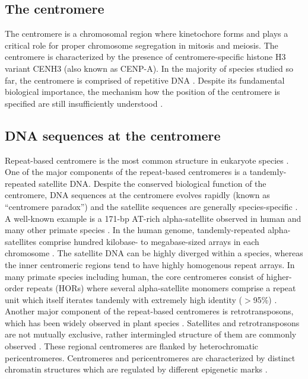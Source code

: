 \subsection*{The centromere}
  The centromere is a chromosomal region where kinetochore forms and plays a critical role for proper chromosome segregation in mitosis and meiosis. The centromere is characterized by the presence of centromere-specific histone H3 variant CENH3 (also known as CENP-A). In the majority of species studied so far, the centromere is comprised of repetitive DNA \cite{Plohl2014}. Despite its fundamental biological importance, the mechanism how the position of the centromere is specified are still insufficiently understood \cite{McKinley2016}.


\subsection*{DNA sequences at the centromere}
  Repeat-based centromere is the most common structure in eukaryote species \cite{Plohl2014}. One of the major components of the repeat-based centromeres is a tandemly-repeated satellite DNA. Despite the conserved biological function of the centromere, DNA sequences at the centromere evolves rapidly (known as ``centromere paradox'') and the satellite sequences are generally species-specific \cite{Henikoff2001}. A well-known example is a 171-bp AT-rich alpha-satellite observed in human and many other primate species \cite{Willard1991}. In the human genome, tandemly-repeated alpha-satellites comprise hundred kilobase- to megabase-sized arrays in each chromosome \cite{Willard1987}. The satellite DNA can be highly diverged within a species, whereas the inner centromeric regions tend to have highly homogenous repeat arrays. In many primate species including human, the core centromeres consist of higher-order repeats (HORs) where several alpha-satellite monomers comprise a repeat unit which itself iterates tandemly with extremely high identity ($>$95\%) \cite{Willard1987}. Another major component of the repeat-based centromeres is retrotransposons, which has been widely observed in plant species \cite{Wang2009, Lermontova2015}. Satellites and retrotransposons are not mutually exclusive, rather intermingled structure of them are commonly observed \cite{Plohl2014}. These regional centromeres are flanked by heterochromatic pericentromeres. Centromeres and pericentromeres are characterized by distinct chromatin structures which are regulated by different epigenetic marks \cite{Verdaasdonk2011, McKinley2016}.

